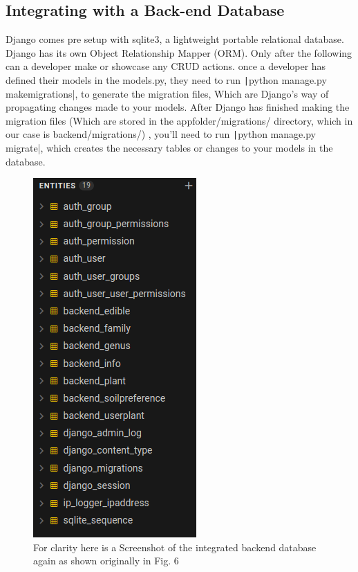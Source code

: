 \documentclass{article}
\begin{document}
    
    \newpage
    
	\subsection{Integrating with a Back-end Database}
        Django comes pre setup with sqlite3, a lightweight portable relational database. Django has its own Object Relationship Mapper (ORM). Only after the following can a developer make or showcase any CRUD actions. once a developer has defined their models in the models.py, they need to run \texttt|python manage.py makemigrations|, to generate the migration files, Which are Django's way of propagating changes made to your models.
        After Django has finished making the migration files (Which are stored in the appfolder/migrations/ directory, which in our case is backend/migrations/) , you'll need to run \texttt|python manage.py migrate|, which creates the necessary tables or changes to your models in the database.
        \\
        
        \begin{figure}
            \centering
            \includegraphics[scale=0.8]{sql1}
            \caption{For clarity here is a Screenshot of the integrated backend database again as shown originally in Fig. 6}
        \end{figure}
    
\end{document}

